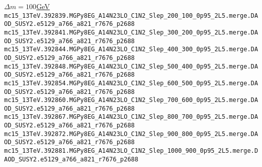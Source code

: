 \underline{$\Delta m=100$GeV}\\
\texttt{mc15\_13TeV.392839.MGPy8EG\_A14N23LO\_C1N2\_Slep\_200\_100\_0p95\_2L5.merge.DAOD\_SUSY2.e5129\_a766\_a821\_r7676\_p2688} \\
\texttt{mc15\_13TeV.392841.MGPy8EG\_A14N23LO\_C1N2\_Slep\_300\_200\_0p95\_2L5.merge.DAOD\_SUSY2.e5129\_a766\_a821\_r7676\_p2688} \\
\texttt{mc15\_13TeV.392844.MGPy8EG\_A14N23LO\_C1N2\_Slep\_400\_300\_0p95\_2L5.merge.DAOD\_SUSY2.e5129\_a766\_a821\_r7676\_p2688} \\
\texttt{mc15\_13TeV.392848.MGPy8EG\_A14N23LO\_C1N2\_Slep\_500\_400\_0p95\_2L5.merge.DAOD\_SUSY2.e5129\_a766\_a821\_r7676\_p2688} \\
\texttt{mc15\_13TeV.392854.MGPy8EG\_A14N23LO\_C1N2\_Slep\_600\_500\_0p95\_2L5.merge.DAOD\_SUSY2.e5129\_a766\_a821\_r7676\_p2688} \\
\texttt{mc15\_13TeV.392860.MGPy8EG\_A14N23LO\_C1N2\_Slep\_700\_600\_0p95\_2L5.merge.DAOD\_SUSY2.e5129\_a766\_a821\_r7676\_p2688} \\
\texttt{mc15\_13TeV.392867.MGPy8EG\_A14N23LO\_C1N2\_Slep\_800\_700\_0p95\_2L5.merge.DAOD\_SUSY2.e5129\_a766\_a821\_r7676\_p2688} \\
\texttt{mc15\_13TeV.392872.MGPy8EG\_A14N23LO\_C1N2\_Slep\_900\_800\_0p95\_2L5.merge.DAOD\_SUSY2.e5129\_a766\_a821\_r7676\_p2688} \\
\texttt{mc15\_13TeV.392881.MGPy8EG\_A14N23LO\_C1N2\_Slep\_1000\_900\_0p95\_2L5.merge.DAOD\_SUSY2.e5129\_a766\_a821\_r7676\_p2688} \\



